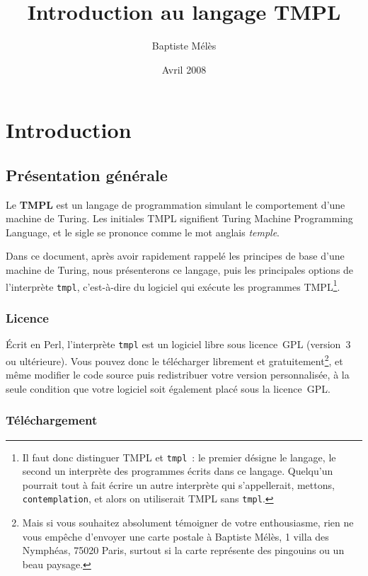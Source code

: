 \documentclass[a4paper, 11pt]{report}
\author{Baptiste Mélès}
\title{Introduction au langage TMPL}
\date{Avril 2008}
\newcommand{\tmpl}{\texttt{tmpl}}
\begin{document}
\maketitle


\part{Introduction}

\chapter{Présentation générale}

Le {\bf TMPL} est un langage de programmation simulant le comportement
d'une machine de Turing. Les initiales TMPL signifient Turing Machine
Programming Language, et le sigle se prononce comme le mot anglais
\emph{temple}.

\par

Dans ce document, après avoir rapidement rappelé les principes de base
d'une machine de Turing, nous présenterons ce langage, puis les
principales options de l'interprète \tmpl{}, c'est-à-dire du
logiciel qui exécute les programmes TMPL\footnote{Il faut donc
  distinguer TMPL et \tmpl{}~: le premier désigne le langage, le
  second un interprète des programmes écrits dans ce langage. Quelqu'un
  pourrait tout à fait écrire un autre interprète qui s'appellerait,
  mettons, \texttt{contemplation}, et alors on utiliserait TMPL sans
  \tmpl{}.}.

\par

\section{Licence}

Écrit en Perl, l'interprète \texttt{tmpl} est un logiciel libre sous
licence~GPL (version~3 ou ultérieure). Vous pouvez donc le télécharger
librement et gratuitement\footnote{Mais si vous souhaitez absolument
  témoigner de votre enthousiasme, rien ne vous empêche d'envoyer une
  carte postale à Baptiste Mélès, 1 villa des Nymphéas, 75020 Paris,
  surtout si la carte représente des pingouins ou un beau paysage.}, et
même modifier le code source puis redistribuer votre version
personnalisée, à la seule condition que votre logiciel soit également
placé sous la licence~GPL.


\section{Téléchargement}
\end{document}
